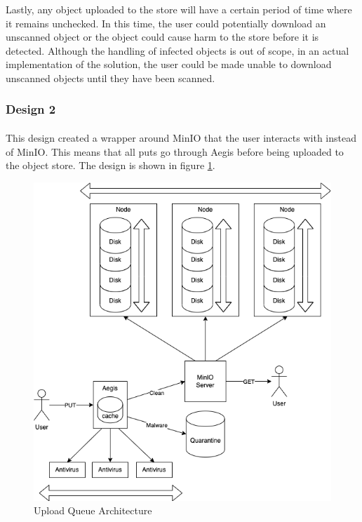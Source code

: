 \documentclass[12pt, conference, final, a4paper, onecolumn, compsoc]{IEEEtran}
\begin{document}
    Lastly, any object uploaded to the store will have a certain period of time
    where it remains unchecked. In this time, the user could potentially
    download an unscanned object or the object could cause harm to the store
    before it is detected. Although the handling of infected objects is out of
    scope, in an actual implementation of the solution, the user could be made
    unable to download unscanned objects until they have been scanned.


    \subsubsection*{Design 2}
    \paragraph{}

    This design created a wrapper around MinIO that the user interacts with
    instead of MinIO. This means that all puts go through Aegis before being
    uploaded to the object store. The design is shown in figure
    \ref{fig:uploadQueueArch}.

    \begin{figure}
        \centering \includegraphics[scale=.4]{diagrams/upload-queue.png}
        \caption{Upload Queue Architecture}
        \label{fig:uploadQueueArch}
    \end{figure}
\end{document}
